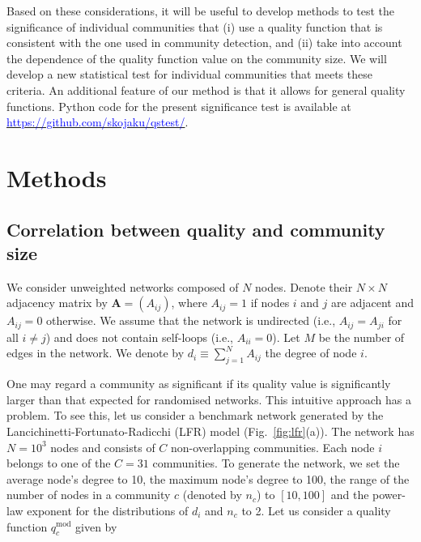 \documentclass[fleqn,10pt]{wlscirep}
\def\qmod{q^{\text{mod}}}
\begin{document}
Based on these considerations, it will be useful to develop methods to test the significance of individual communities that (i) use a quality function that is consistent with the one used in community detection, and (ii) take into account the dependence of the quality function value on the community size. 
We will develop a new statistical test for individual communities that meets these criteria.
An additional feature of our method is that it allows for general quality functions.
Python code for the present significance test is available at \href{https://github.com/skojaku/qstest/}{\textcolor{blue}{https://github.com/skojaku/qstest/}}.


\section{Methods}
\label{sec:methods}
\subsection{Correlation between quality and community size}
\label{sec:quality_and_size}
We consider unweighted networks composed of $N$ nodes. Denote their $N \times N$ adjacency matrix by ${\bm A}=(A_{ij})$, where $A_{ij} = 1$ if nodes $i$ and $j$ are adjacent and $A_{ij}=0$ otherwise.
We assume that the network is undirected (i.e., $A_{ij}=A_{ji}$ for all $i \neq j$) and does not contain self-loops (i.e., $A_{ii}=0$).
Let $M$ be the number of edges in the network. 
We denote by $d_i \equiv \sum_{j=1} ^N A_{ij}$ the degree of node $i$. 

One may regard a community as significant if its quality value is significantly larger than that expected for randomised networks.
This intuitive approach has a problem. 
To see this, let us consider a benchmark network generated by the Lancichinetti-Fortunato-Radicchi (LFR) model \cite{Lancichinetti2008} (Fig.~\ref{fig:lfr}(a)).  
The network has $N=10^3$ nodes and consists of $C$ non-overlapping communities. 
Each node $i$ belongs to one of the $C=31$ communities.
To generate the network, we set the average node's degree to 10, the maximum node's degree to 100, the range of the number of nodes in a community $c$ (denoted by $n_c$) to $[10, 100]$ and the power-law exponent for the distributions of $d_i$ and $n_c$ to 2. 
Let us consider a quality function $\qmod_c$ given by \cite{Leskovec2010,Yang2015}  
\end{document}
